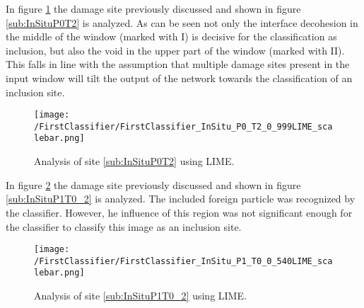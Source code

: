In figure \ref{fig:LIME1} the damage site previously discussed and shown in figure \ref{sub:InSituP0T2} is analyzed. As can be seen not only the interface decohesion in the middle of the window (marked with I) is decisive for the classification as inclusion, but also the void in the upper part of the window (marked with II). This falls in line with the assumption that multiple damage sites present in the input window will tilt the output of the network towards the classification of an inclusion site. \\

\begin{figure}
\centering
\texttt{[image: /FirstClassifier/FirstClassifier\_InSitu\_P0\_T2\_0\_999LIME\_scalebar.png]}
\caption{Analysis of site \ref{sub:InSituP0T2} using LIME.}
\label{fig:LIME1}
\end{figure}

In figure \ref{fig:LIME2} the damage site previously discussed and shown in figure \ref{sub:InSituP1T0_2} is analyzed. The included foreign particle was recognized by the classifier. However, he influence of this region was not significant enough for the classifier to classify this image as an inclusion site.


%
\begin{figure}
\centering
\texttt{[image: /FirstClassifier/FirstClassifier\_InSitu\_P1\_T0\_0\_540LIME\_scalebar.png]}
\caption{Analysis of site \ref{sub:InSituP1T0_2} using LIME.}
\label{fig:LIME2}
\end{figure}


